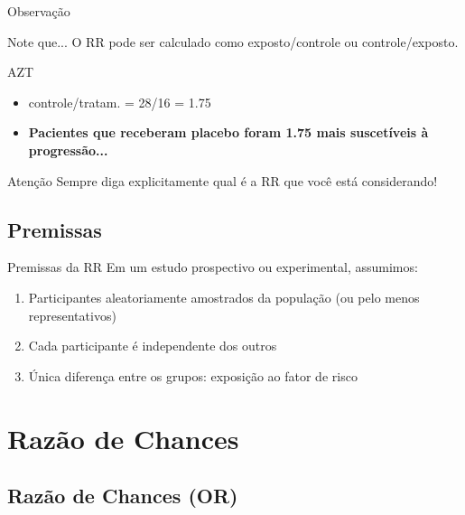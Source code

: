 \documentclass{beamer}
\begin{document}
\begin{frame}{Observação}
  \begin{block}{Note que...}
    O RR pode ser calculado como exposto/controle ou controle/exposto.
  \end{block}
  \begin{exampleblock}{AZT}
    \begin{itemize}
    \item controle/tratam. = 28/16 = 1.75
    \item {\bf Pacientes que receberam placebo foram 1.75 mais suscetíveis à progressão...}
    \end{itemize}
  \end{exampleblock}
  \begin{block}{Atenção}
    Sempre diga explicitamente qual é a RR que você está considerando!
  \end{block}
\end{frame}

\subsection{Premissas}

\begin{frame}{Premissas da RR}
  Em um estudo prospectivo ou experimental, assumimos:
  \begin{enumerate}
  \item Participantes aleatoriamente amostrados da população (ou pelo menos representativos)
  \item Cada participante é independente dos outros
  \item Única diferença entre os grupos: exposição ao fator de risco
  \end{enumerate}
\end{frame}

\section{Razão de Chances}

\subsection{Razão de Chances (OR)}
\end{document}
